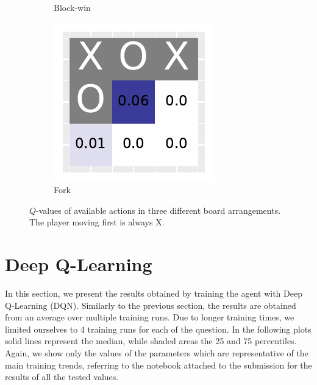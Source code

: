 \documentclass[10pt]{IEEEtran}
\begin{document}
\begin{figure}[h]
\begin{subfigure}[t]{0.32\linewidth}
         \caption{Block-win}
         \label{fig_heatmap_2}
     \end{subfigure}
     \hfill
     \begin{subfigure}[t]{0.32\linewidth}
         \centering
         \includegraphics[width=\linewidth]{code/figures/heatmap_2.pdf}
         \caption{Fork}
         \label{fig_heatmap_3}
     \end{subfigure}
        \caption{$Q$-values of available actions in three different board arrangements. The player moving first is always X.}
        \label{plot_question_10}
\end{figure}

\section{Deep Q-Learning}
In this section, we present the results obtained by training the agent with Deep Q-Learning (DQN). Similarly to the previous section, the results are obtained from an average over multiple training runs. Due to longer training times, we limited ourselves to 4 training runs for each of the question. In the following plots solid lines represent the median, while shaded areas the 25 and 75 percentiles. Again, we show only the values of the parameters which are representative of the main training trends, referring to the notebook attached to the submission for the results of all the tested values. 
\end{document}
